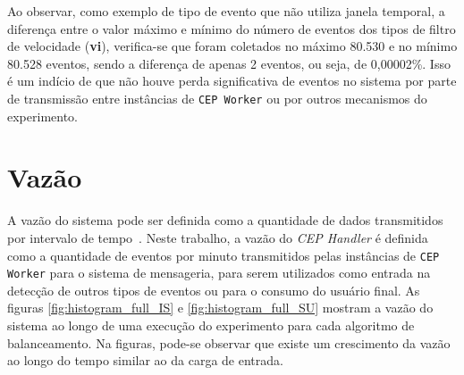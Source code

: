 Ao observar, como exemplo de tipo de evento que não utiliza janela temporal, a diferença entre o valor máximo e mínimo do número de eventos dos tipos de filtro de velocidade (\textbf{vi}), verifica-se que foram coletados no máximo 80.530 e no mínimo 80.528 eventos, sendo a diferença de apenas 2 eventos, ou seja, de 0,00002\%. Isso é um indício de que não houve perda significativa de eventos no sistema por parte de transmissão entre instâncias de \texttt{CEP Worker} ou por outros mecanismos do experimento.











\section{Vazão}
\label{sec:vazao}

A vazão do sistema pode ser definida como a quantidade de dados transmitidos por intervalo de tempo~\citep{bukh1992art}. Neste trabalho, a vazão do \textit{CEP Handler} é definida como a quantidade de eventos por minuto transmitidos pelas instâncias de \texttt{CEP Worker} para o sistema de mensageria, para serem utilizados como entrada na detecção de outros tipos de eventos ou para o consumo do usuário final. %
As figuras \ref{fig:histogram_full_IS} e \ref{fig:histogram_full_SU} mostram a vazão do sistema ao longo de uma execução do experimento para cada algoritmo de balanceamento. Na figuras, pode-se observar que existe um crescimento da vazão ao longo do tempo similar ao da carga de entrada. 

 \afterpage{\clearpage}

